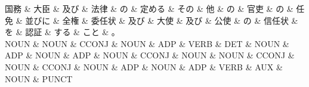 \documentclass[tikz,border=5pt]{standalone}
\begin{document}
\normalsize
\begin{dependency}[edge unit distance=12.0pt]
    \begin{deptext}[column sep=1em]
        国務 \& 大臣 \& 及び \& 法律 \& の \& 定める \& その \& 他 \& の \& 官吏 \& の \& 任免 \& 並びに \& 全権 \& 委任状 \& 及び \& 大使 \& 及び \& 公使 \& の \& 信任状 \& を \& 認証 \& する \& こと \& 。\\
        NOUN \& NOUN \& CCONJ \& NOUN \& ADP \& VERB \& DET \& NOUN \& ADP \& NOUN \& ADP \& NOUN \& CCONJ \& NOUN \& NOUN \& CCONJ \& NOUN \& CCONJ \& NOUN \& ADP \& NOUN \& ADP \& VERB \& AUX \& NOUN \& PUNCT\\
    \end{deptext}
\end{dependency}
\end{document}
